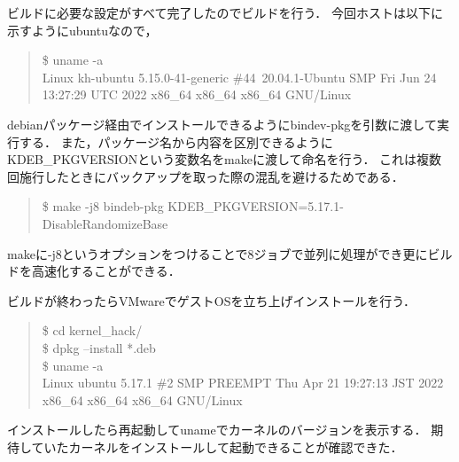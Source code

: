 ビルドに必要な設定がすべて完了したのでビルドを行う．
今回ホストは以下に示すようにubuntuなので，
\begin{quote}
\$ uname -a \\
Linux kh-ubuntu 5.15.0-41-generic \#44~20.04.1-Ubuntu SMP Fri Jun 24 13:27:29 UTC 2022 x86\_64 x86\_64 x86\_64 GNU/Linux
\end{quote}

debianパッケージ経由でインストールできるようにbindev-pkgを引数に渡して実行する．
また，パッケージ名から内容を区別できるようにKDEB\_PKGVERSIONという変数名をmakeに渡して命名を行う．
これは複数回施行したときにバックアップを取った際の混乱を避けるためである．
\begin{quote}
\$ make -j8 bindeb-pkg  KDEB\_PKGVERSION=5.17.1-DisableRandomizeBase
\end{quote}

makeに-j8というオプションをつけることで8ジョブで並列に処理ができ更にビルドを高速化することができる．

ビルドが終わったらVMwareでゲストOSを立ち上げインストールを行う．
\begin{quote}
\$ cd kernel\_hack/ \\
\$ dpkg --install *.deb \\
\$ uname -a \\
Linux ubuntu 5.17.1 \#2 SMP PREEMPT Thu Apr 21 19:27:13 JST 2022 x86\_64 x86\_64 x86\_64 GNU/Linux
\end{quote}

インストールしたら再起動してunameでカーネルのバージョンを表示する．
期待していたカーネルをインストールして起動できることが確認できた．


